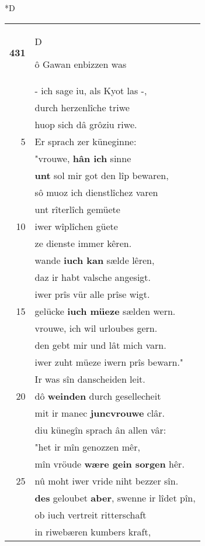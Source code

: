 \documentclass[8pt,a4paper,notitlepage]{article}
\begin{document}
\begin{table}[ht]
\begin{minipage}[t]{0.5\linewidth}
\small
\begin{center}*D
\end{center}
\begin{tabular}{rl}
\textbf{431} & \begin{large}D\end{large}ô Gawan enbizzen was\\ 
 & - ich sage iu, als Kyot las -,\\ 
 & durch herzenlîche triwe\\ 
 & huop sich dâ grôziu riwe.\\ 
5 & Er sprach zer küneginne:\\ 
 & "vrouwe, \textbf{hân ich} sinne\\ 
 & \textbf{unt} sol mir got den lîp bewaren,\\ 
 & sô muoz ich dienstlîchez varen\\ 
 & unt rîterlîch gemüete\\ 
10 & iwer wîplîchen güete\\ 
 & ze dienste immer kêren.\\ 
 & wande \textbf{iuch kan} sælde lêren,\\ 
 & daz ir habt valsche angesigt.\\ 
 & iwer prîs vür alle prîse wigt.\\ 
15 & gelücke \textbf{iuch müeze} sælden wern.\\ 
 & vrouwe, ich wil urloubes gern.\\ 
 & den gebt mir und lât mich varn.\\ 
 & iwer zuht müeze iwern prîs bewarn."\\ 
 & Ir was sîn danscheiden leit.\\ 
20 & dô \textbf{weinden} durch gesellecheit\\ 
 & mit ir manec \textbf{juncvrouwe} clâr.\\ 
 & diu künegîn sprach ân allen vâr:\\ 
 & "het ir mîn genozzen mêr,\\ 
 & mîn vröude \textbf{wære gein sorgen} hêr.\\ 
25 & nû moht iwer vride niht bezzer sîn.\\ 
 & \textbf{des} geloubet \textbf{aber}, swenne ir lîdet pîn,\\ 
 & ob iuch vertreit ritterschaft\\ 
 & in riwebæren kumbers kraft,\\ 

\end{tabular}
\end{minipage}
\end{table}
\end{document}
